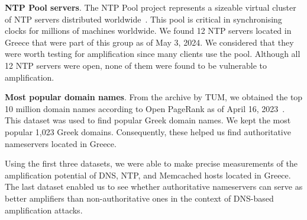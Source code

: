  \textbf{NTP Pool servers}. The NTP Pool project represents a sizeable virtual cluster of NTP servers distributed worldwide~\cite{ntp_pool}. This pool is critical in synchronising clocks for millions of machines worldwide. We found 12 NTP servers located in Greece that were part of this group as of May 3, 2024. We considered that they were worth testing for amplification since many clients use the pool. Although all 12 NTP servers were open, none of them were found to be vulnerable to amplification.

 \textbf{Most popular domain names}. From the archive by TUM, we obtained the top 10 million domain names according to Open PageRank as of April 16, 2023~\cite{tum_domains}. This dataset was used to find popular Greek domain names. We kept the most popular 1,023 Greek domains. Consequently, these helped us find authoritative nameservers located in Greece.
    
 Using the first three datasets, we were able to make precise measurements of the amplification potential of DNS, NTP, and Memcached hosts located in Greece. The last dataset enabled us to see whether authoritative nameservers can serve as better amplifiers than non-authoritative ones in the context of DNS-based amplification attacks.












